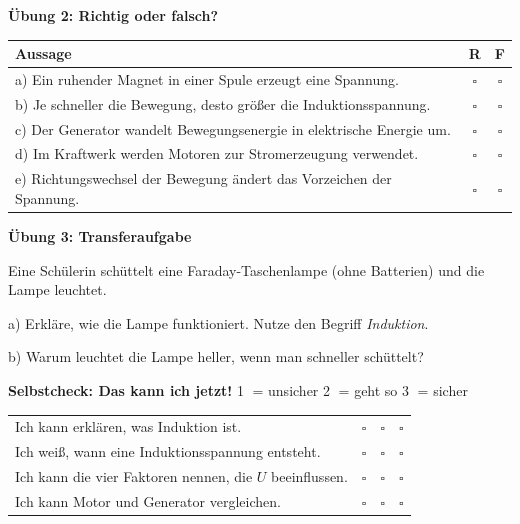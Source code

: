 \documentclass[11pt,a4paper]{article}
\newcommand{\aufgabe}[1]{\noindent\textbf{\textcolor{fachfarbe}{#1}}}
\begin{document}
\aufgabe{Übung 2: Richtig oder falsch?}

\vspace{0.2em}
{\small
\begin{tabular}{|p{12cm}|c|c|}
\hline
\textbf{Aussage} & \textbf{R} & \textbf{F} \\
\hline
a) Ein ruhender Magnet in einer Spule erzeugt eine Spannung. & $\square$ & $\square$ \\
\hline
b) Je schneller die Bewegung, desto größer die Induktionsspannung. & $\square$ & $\square$ \\
\hline
c) Der Generator wandelt Bewegungsenergie in elektrische Energie um. & $\square$ & $\square$ \\
\hline
d) Im Kraftwerk werden Motoren zur Stromerzeugung verwendet. & $\square$ & $\square$ \\
\hline
e) Richtungswechsel der Bewegung ändert das Vorzeichen der Spannung. & $\square$ & $\square$ \\
\hline
\end{tabular}
}

\vspace{0.4em}

\aufgabe{Übung 3: Transferaufgabe}

\vspace{0.2em}
{\small Eine Schülerin schüttelt eine Faraday-Taschenlampe (ohne Batterien) und die Lampe leuchtet.}

\vspace{0.2em}
a) Erkläre, wie die Lampe funktioniert. Nutze den Begriff \textit{Induktion}.

\vspace{1.1cm}

b) Warum leuchtet die Lampe heller, wenn man schneller schüttelt?

\vspace{1.1cm}

\begin{merkkasten}
\textbf{Selbstcheck: Das kann ich jetzt!} \hfill {\scriptsize \textcircled{\scriptsize 1} = unsicher \quad \textcircled{\scriptsize 2} = geht so \quad \textcircled{\scriptsize 3} = sicher}

\vspace{0.2em}
\small
\renewcommand{\arraystretch}{1.1}
\begin{tabular}{p{10.5cm}ccc}
Ich kann erklären, was Induktion ist. & $\square$ & $\square$ & $\square$ \\
Ich weiß, wann eine Induktionsspannung entsteht. & $\square$ & $\square$ & $\square$ \\
Ich kann die vier Faktoren nennen, die $U$ beeinflussen. & $\square$ & $\square$ & $\square$ \\
Ich kann Motor und Generator vergleichen. & $\square$ & $\square$ & $\square$ \\
\end{tabular}
\end{merkkasten}
\end{document}
